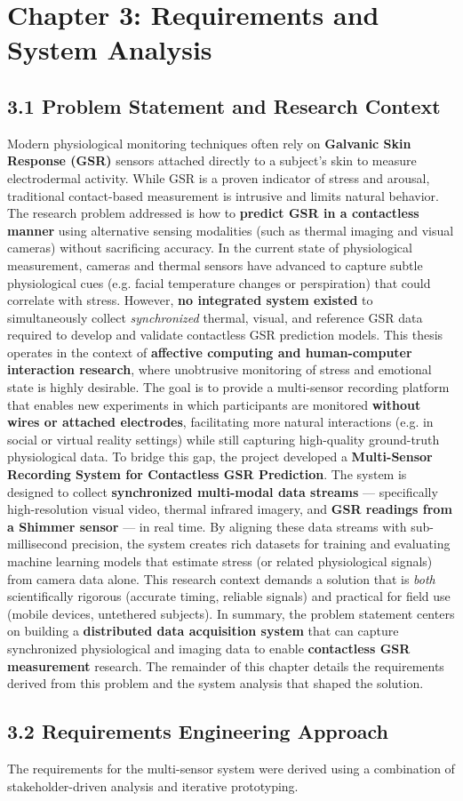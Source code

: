 \label{chap:3} \chapter{Chapter 3: Requirements and System Analysis} \section{3.1 Problem Statement and Research Context} Modern physiological monitoring techniques often rely on \textbf{Galvanic Skin Response (GSR)} sensors attached directly to a subject's skin to measure electrodermal activity. While GSR is a proven indicator of stress and arousal, traditional contact-based measurement is intrusive and limits natural behavior. The research problem addressed is how to \textbf{predict GSR in a contactless manner} using alternative sensing modalities (such as thermal imaging and visual cameras) without sacrificing accuracy. In the current state of physiological measurement, cameras and thermal sensors have advanced to capture subtle physiological cues (e.g. facial temperature changes or perspiration) that could correlate with stress. However, \textbf{no integrated system existed} to simultaneously collect \textit{synchronized} thermal, visual, and reference GSR data required to develop and validate contactless GSR prediction models. This thesis operates in the context of \textbf{affective computing and human-computer interaction research}, where unobtrusive monitoring of stress and emotional state is highly desirable. The goal is to provide a multi-sensor recording platform that enables new experiments in which participants are monitored \textbf{without wires or attached electrodes}, facilitating more natural interactions (e.g. in social or virtual reality settings) while still capturing high-quality ground-truth physiological data. To bridge this gap, the project developed a \textbf{Multi-Sensor Recording System for Contactless GSR Prediction}. The system is designed to collect \textbf{synchronized multi-modal data streams} --- specifically high-resolution visual video, thermal infrared imagery, and \textbf{GSR readings from a Shimmer sensor} --- in real time. By aligning these data streams with sub-millisecond precision, the system creates rich datasets for training and evaluating machine learning models that estimate stress (or related physiological signals) from camera data alone. This research context demands a solution that is \textit{both} scientifically rigorous (accurate timing, reliable signals) and practical for field use (mobile devices, untethered subjects). In summary, the problem statement centers on building a \textbf{distributed data acquisition system} that can capture synchronized physiological and imaging data to enable \textbf{contactless GSR measurement} research. The remainder of this chapter details the requirements derived from this problem and the system analysis that shaped the solution. \section{3.2 Requirements Engineering Approach} The requirements for the multi-sensor system were derived using a combination of stakeholder-driven analysis and iterative prototyping. 